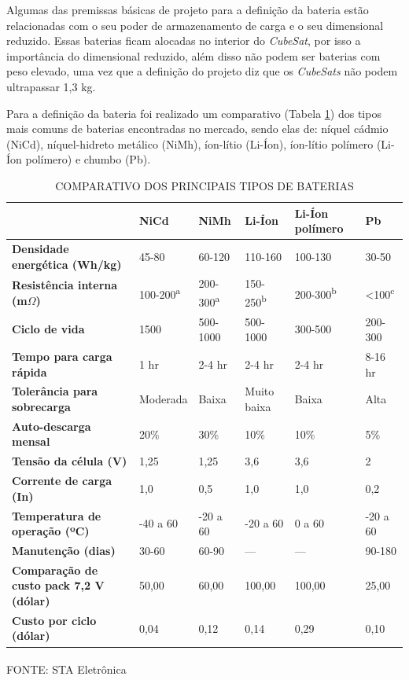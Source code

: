 \documentclass[
	12pt,				%
	openright,			%
	oneside,			%
	a4paper,			%
	english,			%
	french,				%
	spanish,			%
	brazil,				%
	oldfontcommands
	]{abntex2}
\begin{document}
	Algumas das premissas básicas de projeto para a definição da bateria estão relacionadas com o seu poder de armazenamento de carga e o seu dimensional reduzido. Essas baterias ficam alocadas no interior do \textit{CubeSat}, por isso a importância do dimensional reduzido, além disso não podem ser baterias com peso elevado, uma vez que a definição do projeto diz que os \textit{CubeSats} não podem ultrapassar 1,3 kg.
	
	Para a definição da bateria foi realizado um comparativo (Tabela \ref{Tab_Bateria}) dos tipos mais comuns de baterias encontradas no mercado, sendo elas de: níquel cádmio (NiCd), níquel-hidreto metálico (NiMh), íon-lítio (Li-Íon), íon-lítio polímero (Li-Íon polímero) e chumbo (Pb).
		
	\begin{table}[th]
		\caption{COMPARATIVO DOS PRINCIPAIS TIPOS DE BATERIAS}
		\label{Tab_Bateria}
		\begin{tabular}{p{3.5cm}|p{1.6cm}|p{1.6cm}|p{1.6cm}|p{2cm}|p{1.6cm}}
	 	& \textbf{NiCd} & \textbf{NiMh} & \textbf{Li-Íon} & \textbf{Li-Íon polímero} & \textbf{Pb} \\
	 	\hline
		\textbf{Densidade energética (Wh/kg)} & 45-80 & 60-120 & 110-160 & 100-130 & 30-50 \\
	 	\hline
	 	\textbf{Resistência interna (m$\Omega$)} & 100-200\textsuperscript{a} & 200-300\textsuperscript{a} & 150-250\textsuperscript{b} & 200-300\textsuperscript{b} & <100\textsuperscript{c} \\
	 	\hline
	 	\textbf{Ciclo de vida} & 1500 & 500-1000 & 500-1000 & 300-500 & 200-300 \\
		\hline
		\textbf{Tempo para carga rápida} & 1 hr & 2-4 hr & 2-4 hr & 2-4 hr & 8-16 hr \\
		\hline
		\textbf{Tolerância para sobrecarga} & Moderada & Baixa & Muito baixa & Baixa & Alta \\
		\hline
		\textbf{Auto-descarga mensal} & 20\% & 30\% & 10\% & 10\% & 5\% \\
		\hline
		\textbf{Tensão da célula (V)} & 1,25 & 1,25 & 3,6 & 3,6 & 2 \\
		\hline
		\textbf{Corrente de carga (In)} & 1,0 & 0,5 & 1,0 & 1,0 & 0,2 \\
		\hline
		\textbf{Temperatura de operação (ºC)} & -40 a 60 & -20 a 60 & -20 a 60 & 0 a 60 & -20 a 60 \\
		\hline
		\textbf{Manutenção (dias)} & 30-60 & 60-90 & --- & --- & 90-180 \\
		\hline
		\textbf{Comparação de custo pack 7,2 V (dólar)} & 50,00 & 60,00 & 100,00 & 100,00 & 25,00 \\
		\hline
		\textbf{Custo por ciclo (dólar)} & 0,04 & 0,12 & 0,14 & 0,29 & 0,10 \\
		\hline 
		\end{tabular}
	\centering
	\begin{small}
	\vspace{3pt}
		FONTE: STA Eletrônica\textsuperscript{\cite{sta}}
	\end{small}
	

\end{table}
\end{document}
